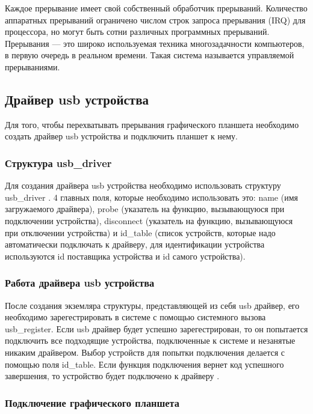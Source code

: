 Каждое прерывание имеет свой собственный обработчик прерываний. Количество аппаратных прерываний ограничено числом строк запроса прерывания (IRQ) для процессора, но могут быть сотни различных программных прерываний. Прерывания — это широко используемая техника многозадачности компьютеров, в первую очередь в реальном времени. Такая система называется управляемой прерываниями.

\subsection{Драйвер usb устройства}

Для того, чтобы перехватывать прерывания графического планшета необходимо создать драйвер usb устройства и подключить планшет к нему.

\subsubsection{Структура usb\_driver}

Для создания драйвера usb устройства необходимо использовать структуру usb\_driver \cite{Usb_driver}. 4 главных поля, которые необходимо использовать это: name (имя загружаемого драйвера), probe (указатель на функцию, вызывающуюся при подключении устройства), disconnect (указатель на функцию, вызывающуюся при отключении устройства) и id\_table (список устройств, которые надо автоматически подключать к драйверу, для идентификации устройства используются id поставщика устройства и id самого устройства).

\subsubsection{Работа драйвера usb устройства}

После создания экземляра структуры, представляющей из себя usb драйвер, его необходимо зарегестрировать в системе с помощью системного вызова usb\_register. Если usb драйвер будет успешно зарегестрирован, то он попытается подключить все подходящие устройства, подключенные к системе и незанятые никаким драйвером. Выбор устройств для попытки подключения делается с помощью поля id\_table. Если функция подключения вернет код успешного завершения, то устройство будет подключено к драйверу \cite{Usb_driver}.

\subsubsection{Подключение графического планшета}

